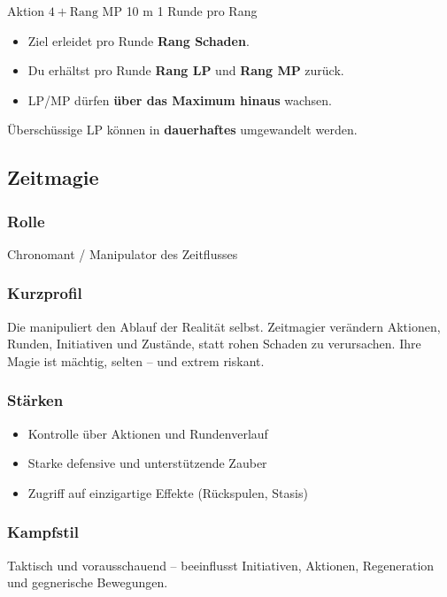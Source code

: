 \spellcard
{}
{Aktion}
{$4 + \text{Rang}$ MP}
{10 m}
{1 Runde pro Rang}
{
	\begin{itemize}
		\item Ziel erleidet pro Runde \textbf{Rang Schaden}.
		\item Du erhältst pro Runde \textbf{Rang LP} und \textbf{Rang MP} zurück.
		\item LP/MP dürfen \textbf{über das Maximum hinaus} wachsen.
	\end{itemize}
}
{
	Überschüssige LP können in \textbf{dauerhaftes}  umgewandelt werden.
}

\subsection{Zeitmagie}

\subsubsection*{Rolle}
Chronomant / Manipulator des Zeitflusses

\subsubsection*{Kurzprofil}
Die  manipuliert den Ablauf der Realität selbst.
Zeitmagier verändern Aktionen, Runden, Initiativen und Zustände, statt rohen Schaden
zu verursachen. Ihre Magie ist mächtig, selten – und extrem riskant.

\subsubsection*{Stärken}
\begin{itemize}
	\item Kontrolle über Aktionen und Rundenverlauf
	\item Starke defensive und unterstützende Zauber
	\item Zugriff auf einzigartige Effekte (Rückspulen, Stasis)
\end{itemize}

\subsubsection*{Kampfstil}
Taktisch und vorausschauend – beeinflusst Initiativen, Aktionen,
Regeneration und gegnerische Bewegungen.

